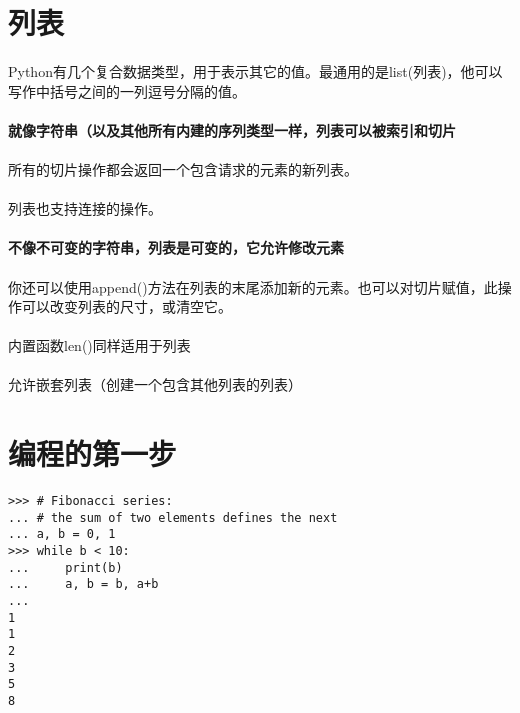 \documentclass{article}
\begin{document}
\begin{CJK}{UTF8}{gbsn}
\section{列表}
\paragraph{}
Python有几个复合数据类型，用于表示其它的值。最通用的是list(列表)，他可以写作中括号之间的一列逗号分隔的值。
\paragraph{}
{\color{green}{列表的元素不必是同一类型}}
\paragraph{}
\textbf{就像字符串（以及其他所有内建的序列类型一样，列表可以被索引和切片}
\paragraph{}
所有的切片操作都会返回一个包含请求的元素的新列表。
\paragraph{}
列表也支持连接的操作。
\paragraph{}
\textbf{不像不可变的字符串，列表是可变的，它允许修改元素}
\paragraph{}
你还可以使用append()方法在列表的末尾添加新的元素。也可以对切片赋值，此操作可以改变列表的尺寸，或清空它。
\paragraph{}
内置函数len()同样适用于列表
\paragraph{}
允许嵌套列表（创建一个包含其他列表的列表）
\section{编程的第一步}
\paragraph{}
\begin{verbatim}
>>> # Fibonacci series:
... # the sum of two elements defines the next
... a, b = 0, 1
>>> while b < 10:
...     print(b)
...     a, b = b, a+b
...
1
1
2
3
5
8
\end{verbatim}

\end{CJK}
\end{document}
